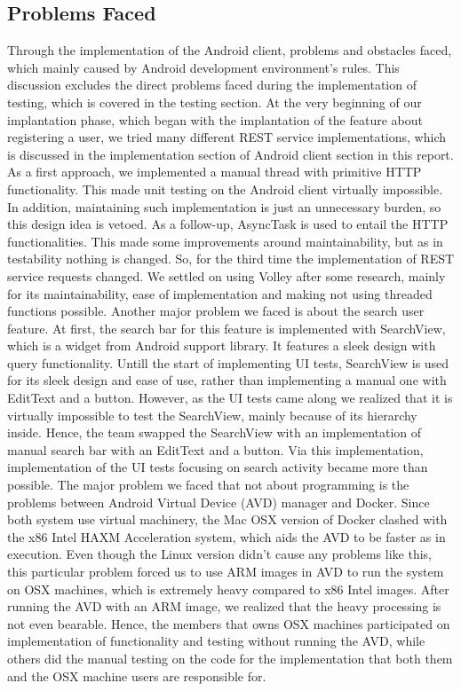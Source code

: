 \documentclass[11pt,a4paper]{report}
\begin{document}
\subsection{Problems Faced} \label{android-problems-faced}
Through the implementation of the Android client, problems and obstacles faced, which mainly caused by Android development environment’s rules. This discussion excludes the direct problems faced during the implementation of testing, which is covered in the testing section.
At the very beginning of our implantation phase, which began with the implantation of the feature about registering a user, we tried many different REST service implementations, which is discussed in the implementation section of Android client section in this report. As a first approach, we implemented a manual thread with primitive HTTP functionality. This made unit testing on the Android client virtually impossible. In addition, maintaining such implementation is just an unnecessary burden, so this design idea is vetoed. As a follow-up, AsyncTask is used to entail the HTTP functionalities. This made some improvements around maintainability, but as in testability nothing is changed. So, for the third time the implementation of REST service requests changed. We settled on using Volley after some research, mainly for its maintainability, ease of implementation and making not using threaded functions possible.
Another major problem we faced is about the search user feature. At first, the search bar for this feature is implemented with SearchView, which is a widget from Android support library. It features a sleek design with query functionality. Untill the start of implementing UI tests, SearchView is used for its sleek design and ease of use, rather than implementing a manual one with EditText and a button. However, as the UI tests came along we realized that it is virtually impossible to test the SearchView, mainly because of its hierarchy inside. Hence, the team swapped the SearchView with an implementation of manual search bar with an EditText and a button. Via this implementation, implementation of the UI tests focusing on search activity became more than possible.
The major problem we faced that not about programming is the problems between Android Virtual Device (AVD) manager and Docker. Since both system use virtual machinery, the Mac OSX version of Docker clashed with the x86 Intel HAXM Acceleration system, which aids the AVD to be faster as in execution. Even though the Linux version didn’t cause any problems like this, this particular problem forced us to use ARM images in AVD to run the system on OSX machines, which is extremely heavy compared to x86 Intel images. After running the AVD with an ARM image, we realized that the heavy processing is not even bearable. Hence, the members that owns OSX machines participated on implementation of functionality and testing without running the AVD, while others did the manual testing on the code for the implementation that both them and the OSX machine users are responsible for.
\end{document}

